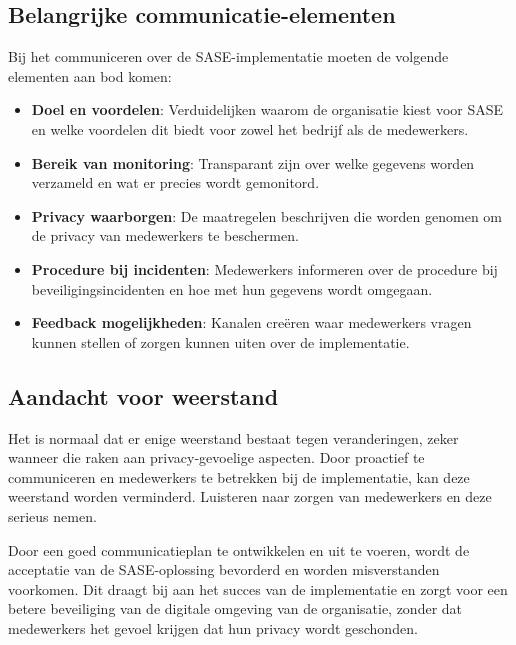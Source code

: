 \subsection{Belangrijke communicatie-elementen}
Bij het communiceren over de SASE-implementatie moeten de volgende elementen aan bod komen:

\begin{itemize}
    \item \textbf{Doel en voordelen}: Verduidelijken waarom de organisatie kiest voor SASE en welke voordelen dit biedt voor zowel het bedrijf als de medewerkers.
    \item \textbf{Bereik van monitoring}: Transparant zijn over welke gegevens worden verzameld en wat er precies wordt gemonitord.
    \item \textbf{Privacy waarborgen}: De maatregelen beschrijven die worden genomen om de privacy van medewerkers te beschermen.
    \item \textbf{Procedure bij incidenten}: Medewerkers informeren over de procedure bij beveiligingsincidenten en hoe met hun gegevens wordt omgegaan.
    \item \textbf{Feedback mogelijkheden}: Kanalen creëren waar medewerkers vragen kunnen stellen of zorgen kunnen uiten over de implementatie.
\end{itemize}

\subsection{Aandacht voor weerstand}
Het is normaal dat er enige weerstand bestaat tegen veranderingen, zeker wanneer die raken aan privacy-gevoelige aspecten. Door proactief te communiceren en medewerkers te betrekken bij de implementatie, kan deze weerstand worden verminderd. Luisteren naar zorgen van medewerkers en deze serieus nemen.

Door een goed communicatieplan te ontwikkelen en uit te voeren, wordt de acceptatie van de SASE-oplossing bevorderd en worden misverstanden voorkomen. Dit draagt bij aan het succes van de implementatie en zorgt voor een betere beveiliging van de digitale omgeving van de organisatie, zonder dat medewerkers het gevoel krijgen dat hun privacy wordt geschonden.
